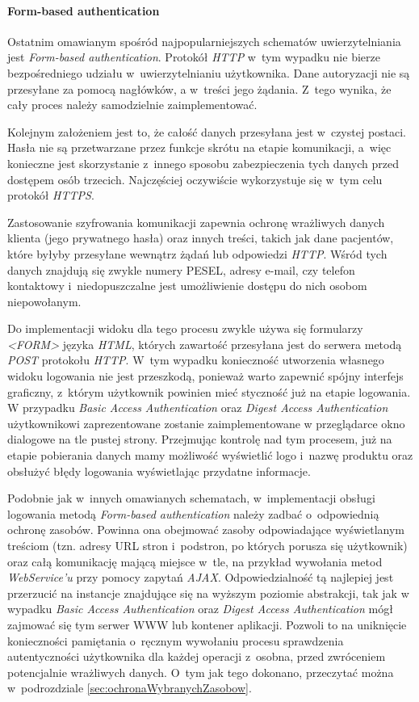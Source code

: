 \documentclass[11pt]{aghdpl}
\begin{document}
\paragraph{Form-based authentication}

Ostatnim omawianym spośród najpopularniejszych schematów uwierzytelniania jest \emph{Form-based authentication}. Protokół \emph{HTTP} w~tym wypadku nie bierze bezpośredniego udziału w~uwierzytelnianiu użytkownika. Dane autoryzacji nie są przesyłane za pomocą nagłówków, a w~treści jego żądania. Z~tego wynika, że cały proces należy samodzielnie zaimplementować.

Kolejnym założeniem jest to, że całość danych przesyłana jest w~czystej postaci. Hasła nie są przetwarzane przez funkcje skrótu na etapie komunikacji, a~więc konieczne jest skorzystanie z~innego sposobu zabezpieczenia tych danych przed dostępem osób trzecich. Najczęściej oczywiście wykorzystuje się w~tym celu protokół \emph{HTTPS}.

Zastosowanie szyfrowania komunikacji zapewnia ochronę wrażliwych danych klienta (jego prywatnego hasła) oraz innych treści, takich jak dane pacjentów, które byłyby przesyłane wewnątrz żądań lub odpowiedzi \emph{HTTP}. Wśród tych danych znajdują się zwykle numery PESEL, adresy e-mail, czy telefon kontaktowy i~niedopuszczalne jest umożliwienie dostępu do nich osobom niepowołanym.

Do implementacji widoku dla tego procesu zwykle używa się formularzy \emph{<FORM>} języka \emph{HTML}, których zawartość przesyłana jest do serwera metodą \emph{POST} protokołu \emph{HTTP}. W~tym wypadku konieczność utworzenia własnego widoku logowania nie jest przeszkodą, ponieważ warto zapewnić spójny interfejs graficzny, z~którym użytkownik powinien mieć styczność już na etapie logowania. W przypadku \emph{Basic Access Authentication} oraz \emph{Digest Access Authentication} użytkownikowi zaprezentowane zostanie zaimplementowane w przeglądarce okno dialogowe na tle pustej strony. Przejmując kontrolę nad tym procesem, już na etapie pobierania danych mamy możliwość wyświetlić logo i~nazwę produktu oraz obsłużyć błędy logowania wyświetlając przydatne informacje.

Podobnie jak w~innych omawianych schematach, w~implementacji obsługi logowania metodą \emph{Form-based authentication} należy zadbać o~odpowiednią ochronę zasobów. Powinna ona obejmować zasoby odpowiadające wyświetlanym treściom (tzn. adresy URL stron i~podstron, po których porusza się użytkownik) oraz całą komunikację mającą miejsce w~tle, na przykład wywołania metod \emph{WebService'u} przy pomocy zapytań \emph{AJAX}. Odpowiedzialność tą najlepiej jest przerzucić na instancje znajdujące się na wyższym poziomie abstrakcji, tak jak w wypadku \emph{Basic Access Authentication} oraz \emph{Digest Access Authentication} mógł zajmować się tym serwer WWW lub kontener aplikacji. Pozwoli to na uniknięcie konieczności pamiętania o~ręcznym wywołaniu procesu sprawdzenia autentyczności użytkownika dla każdej operacji z~osobna, przed zwróceniem potencjalnie wrażliwych danych. O~tym jak tego dokonano, przeczytać można w~podrozdziale \ref{sec:ochronaWybranychZasobow}.
\end{document}
